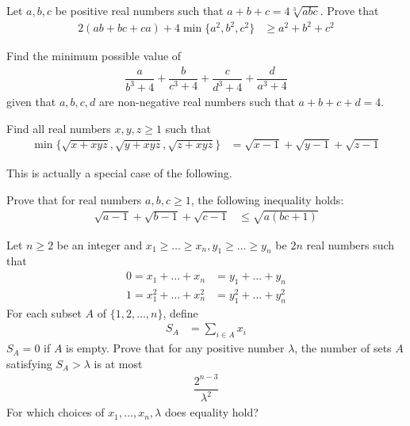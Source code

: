\documentclass{subfile}
\begin{document}
		\begin{problem}
			Let $a,b,c$ be positive real numbers such that $a+b+c=4\sqrt[3]{abc}$. Prove that
				\begin{align*}
					2(ab+bc+ca)+4\min\{a^{2},b^{2},c^{2}\}
						& \geq a^{2}+b^{2}+c^{2}
				\end{align*}
		\end{problem}
	
		\begin{problem}
			Find the minimum possible value of
				\begin{align*}
					\dfrac{a}{b^{3}+4}+\dfrac{b}{c^{3}+4}+\dfrac{c}{d^{3}+4}+\dfrac{d}{a^{3}+4}
				\end{align*}
			given that $a,b,c,d$ are non-negative real numbers such that $a+b+c+d=4$.
		\end{problem}
	
		\begin{problem}
			Find all real numbers $x,y,z\ge1$ such that
				\begin{align*}
					\min\{\sqrt{x+xyz},\sqrt{y+xyz},\sqrt{z+xyz}\}
						& = \sqrt{x-1}+\sqrt{y-1}+\sqrt{z-1}
				\end{align*}
		\end{problem}
	This is actually a special case of the following.
		\begin{problem}
			Prove that for real numbers $a,b,c\geq1$, the following inequality holds:
				\begin{align*}
					\sqrt{a-1}+\sqrt{b-1}+\sqrt{c-1}
						& \leq\sqrt{a(bc+1)}
				\end{align*}
		\end{problem}
	
		\begin{problem}
			Let $n\geq2$ be an integer and $x_{1}\geq\ldots\geq x_{n},y_{1}\geq\ldots\geq y_{n}$ be $2n$ real numbers such that
				\begin{align*}
					0 = x_{1}+\ldots+x_{n}
						& = y_{1}+\ldots+y_{n}\\
					1 = x_{1}^{2}+\ldots+x_{n}^{2}
						& = y_{1}^{2}+\ldots+y_{n}^{2}
				\end{align*}
			For each subset $A$ of $\{1,2,\ldots,n\}$, define
				\begin{align*}
					S_{A}
						& = \sum_{i\in A}x_{i}
				\end{align*}
			$S_{A}=0$ if $A$ is empty. Prove that for any positive number $\lambda$, the number of sets $A$ satisfying $S_{A}>\lambda$ is at most
				\begin{align*}
					\dfrac{2^{n-3}}{\lambda^{2}}
				\end{align*}
			For which choices of $x_{1},\ldots,x_{n},\lambda$ does equality hold?
		\end{problem}
\end{document}
